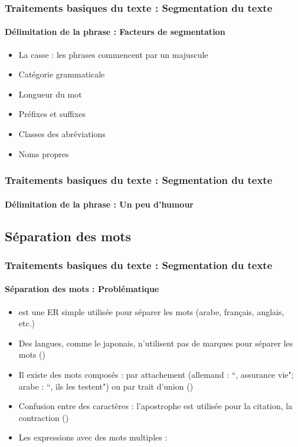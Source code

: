 \documentclass[xcolor=table]{beamer}
\begin{document}
\begin{frame}
\frametitle{Traitements basiques du texte : Segmentation du texte}
\framesubtitle{Délimitation de la phrase : Facteurs de segmentation} 

\begin{itemize}
	\item La casse : les phrases commencent par un majuscule
	\item Catégorie grammaticale
	\item Longueur du mot 
	\item Préfixes et suffixes 
	\item Classes des abréviations 
	\item Noms propres 
\end{itemize}

\end{frame}

\begin{frame}
\frametitle{Traitements basiques du texte : Segmentation du texte}
\framesubtitle{Délimitation de la phrase : Un peu d'humour} 


\end{frame}

\subsection{Séparation des mots}

\begin{frame}
\frametitle{Traitements basiques du texte : Segmentation du texte}
\framesubtitle{Séparation des mots : Problématique}

\begin{itemize}
	\item \expword{/[ ]+/} est une ER simple utilisée pour séparer les mots (arabe, français, anglais, etc.)
	\item Des langues, comme le japonais, n'utilisent pas de marques pour séparer les mots ()
	\item Il existe des mots composés : par attachement (allemand : ``, assurance vie"; arabe : ``, ils les testent") ou par trait d'union ()
	\item Confusion entre des caractères : l'apostrophe est utilisée pour la citation, la contraction () 
	\item Les expressions avec des mots multiples : 
\end{itemize}

\end{frame}
\end{document}
